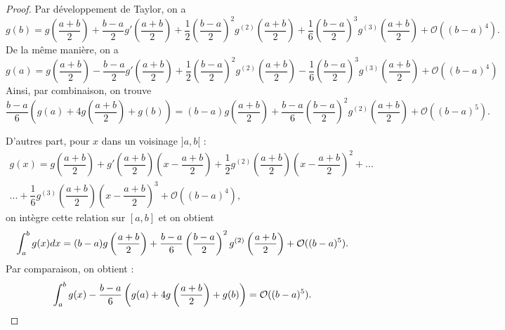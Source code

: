 \begin{proof}
Par développement de Taylor, on a
\begin{equation}g(b) = g\left(\dfrac{a+b}{2}\right) + \dfrac{b-a}{2} g'\left(\dfrac{a+b}{2}\right) + \dfrac{1}{2} \left( \dfrac{b-a}{2} \right)^2 g^{(2)}\left(\dfrac{a+b}{2}\right)  + \dfrac{1}{6} \left( \dfrac{b-a}{2} \right)^3 g^{(3)}\left(\dfrac{a+b}{2}\right) + \mathcal{O}((b-a)^4).
\end{equation}
De la même manière, on a
\begin{equation}g(a) = g\left(\dfrac{a+b}{2}\right) - \dfrac{b-a}{2} g'\left(\dfrac{a+b}{2}\right) + \dfrac{1}{2} \left( \dfrac{b-a}{2} \right)^2 g^{(2)}\left(\dfrac{a+b}{2}\right)  - \dfrac{1}{6} \left( \dfrac{b-a}{2} \right)^3 g^{(3)}\left(\dfrac{a+b}{2}\right) + \mathcal{O}((b-a)^4)
\end{equation}
Ainsi, par combinaison, on trouve
\begin{equation}
\dfrac{b-a}{6} \left( g(a) + 4 g\left( \dfrac{a+b}{2} \right) + g(b) \right) = (b-a)g\left( \dfrac{a+b}{2} \right) + \dfrac{b-a}{6} \left( \dfrac{b-a}{2} \right)^2 g^{(2)}\left( \dfrac{a+b}{2} \right) + \mathcal{O}((b-a)^5).
\end{equation}

D'autres part, pour $x$ dans un voisinage $]a,b[$ :
\begin{multline}
g(x) = g\left( \dfrac{a+b}{2} \right) + g'\left( \dfrac{a+b}{2} \right) \left( x - \dfrac{a+b}{2} \right)  + \dfrac{1}{2} g^{(2)}\left( \dfrac{a+b}{2} \right) \left( x - \dfrac{a+b}{2} \right)^2 + ...\\
...+ \dfrac{1}{6} g^{(3)}\left( \dfrac{a+b}{2} \right) \left( x - \dfrac{a+b}{2} \right)^3 + \mathcal{O}((b-a)^4),
\end{multline}
on intègre cette relation sur $[a,b]$ et on obtient 
\begin{equation}
\displaystyle\int_a^b g(x) dx = (b-a)g\left( \dfrac{a+b}{2} \right) +
 \dfrac{b-a}{6} \left( \dfrac{b-a}{2} \right)^2 g^{(2)}\left( \dfrac{a+b}{2} \right) + \mathcal{O}((b-a)^5).
\end{equation}
Par comparaison, on obtient :
\begin{equation}
\displaystyle\int_a^b g(x) - \dfrac{b-a}{6} \left( g(a) + 4 g\left( \dfrac{a+b}{2} \right) + g(b) \right) = \mathcal{O}((b-a)^5).
\end{equation}
\end{proof}

